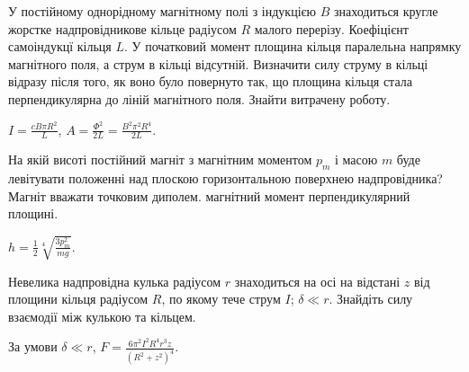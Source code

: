 \begin{problem}
У постійному однорідному магнітному полі з індукцією $B$ знаходиться кругле жорстке надпровідникове кільце радіусом $R$ малого перерізу. Коефіцієнт самоіндукцї кільця  $L$. У початковий момент площина кільця паралельна напрямку магнітного поля, а струм в кільці відсутній. Визначити силу струму в кільці відразу після того, як воно було повернуто так, що площина кільця стала перпендикулярна до ліній магнітного поля. Знайти витрачену роботу.
\begin{solution}
	$I = \frac{cB\pi R^2}{L}$, $A = \frac{\Phi^2}{2L} = \frac{B^2\pi^2 R^4}{2L}$.
\end{solution}
\end{problem}

\begin{problem}
На якій висоті постійний магніт з магнітним моментом $p_m$ і масою $m$ буде левітувати положенні над плоскою горизонтальною поверхнею надпровідника? Магніт вважати точковим диполем. магнітний момент перпендикулярний площині.
\begin{solution}
	$h = \frac12 \sqrt[4]{\frac{3p_m^2}{mg}}$.
\end{solution}
\end{problem}


\begin{problem}
Невелика надпровідна кулька радіусом $r$ знаходиться на осі на відстані $z$ від площини кільця радіусом $R$, по якому тече струм $I$; $\delta \ll r$. Знайдіть силу взаємодії між кулькою та кільцем.
\begin{solution}
    За умови $\delta \ll r$,   $F=\frac{6\pi^2 I^2 R^4 r^3 z}{(R^2+z^2)^4}$.
\end{solution}
\end{problem}


